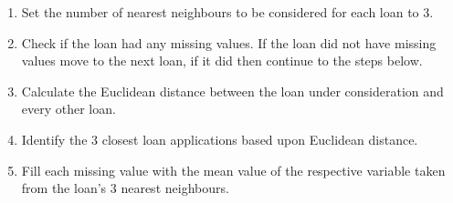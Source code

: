 \begin{enumerate}
    \item Set the number of nearest neighbours to be considered for each loan to 3. 
    \item Check if the loan had any missing values. If the loan did not have missing values move to the next loan, if it did then continue to the steps below. 
    \item Calculate the Euclidean distance between the loan under consideration and every other loan. 
    \item Identify the 3 closest loan applications based upon Euclidean distance. 
    \item Fill each missing value with the mean value of the respective variable taken from the loan's 3 nearest neighbours. 
\end{enumerate}
